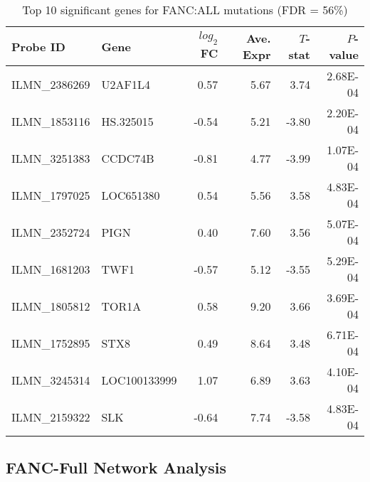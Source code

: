 \documentclass{article}\usepackage{knitr}
\begin{document}
\begin{table}[ht]
\centering
\caption{Top 10 significant genes for FANC:ALL mutations (FDR = 56\%)} 
\label{tab:ALL Results}
{\footnotesize
\begin{tabular}{llrrrr}
  \toprule 
 Probe ID & Gene & $log_2$FC & Ave. Expr & $T$-stat & $P$-value\\
 \midrule 
 ILMN\_2386269 & U2AF1L4 & 0.57 & 5.67 & 3.74 & 2.68E-04 \\ 
  ILMN\_1853116 & HS.325015 & -0.54 & 5.21 & -3.80 & 2.20E-04 \\ 
  ILMN\_3251383 & CCDC74B & -0.81 & 4.77 & -3.99 & 1.07E-04 \\ 
  ILMN\_1797025 & LOC651380 & 0.54 & 5.56 & 3.58 & 4.83E-04 \\ 
  ILMN\_2352724 & PIGN & 0.40 & 7.60 & 3.56 & 5.07E-04 \\ 
  ILMN\_1681203 & TWF1 & -0.57 & 5.12 & -3.55 & 5.29E-04 \\ 
  ILMN\_1805812 & TOR1A & 0.58 & 9.20 & 3.66 & 3.69E-04 \\ 
  ILMN\_1752895 & STX8 & 0.49 & 8.64 & 3.48 & 6.71E-04 \\ 
  ILMN\_3245314 & LOC100133999 & 1.07 & 6.89 & 3.63 & 4.10E-04 \\ 
  ILMN\_2159322 & SLK & -0.64 & 7.74 & -3.58 & 4.83E-04 \\ 
   \bottomrule 
\end{tabular}
}
\end{table}




\subsection{FANC-Full Network Analysis}
\end{document}
